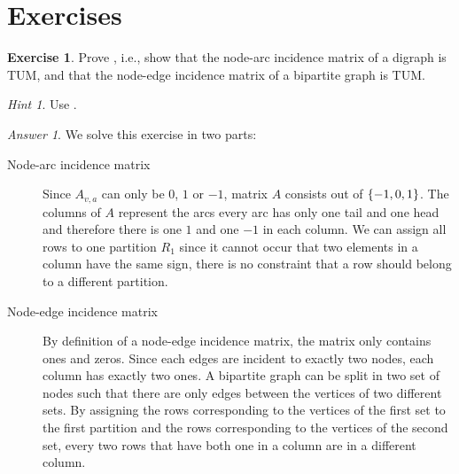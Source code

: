 \documentclass[titlepage]{book}
\theoremstyle{plain}
\theoremstyle{definition}
\newtheorem{exercise}{Exercise}[chapter]
\theoremstyle{remark}
\newtheorem{answer}{Answer}
\newtheorem{hint}{Hint}
\begin{document}
\section*{Exercises}
\begin{exercise}
Prove , i.e., show that the node-arc incidence matrix of a digraph is TUM, and that the node-edge incidence matrix of a bipartite graph is TUM.
\begin{hint}
Use .
\end{hint}
\begin{answer}We solve this exercise in two parts:
\begin{description}
 \item [Node-arc incidence matrix] Since $A_{v,a}$ can only be $0$, $1$ or $-1$, matrix $A$ consists out of $\left\{ -1,0,1 \right\}$. The columns of $A$ represent the arcs every arc has only one tail and one head and therefore there is one $1$ and one $-1$ in each column. We can assign all rows to one partition $R_1$ since it cannot occur that two elements in a column have the same sign, there is no constraint that a row should belong to a different partition.
 \item [Node-edge incidence matrix] By definition of a node-edge incidence matrix, the matrix only contains ones and zeros. Since each edges are incident to exactly two nodes, each column has exactly two ones. A bipartite graph can be split in two set of nodes such that there are only edges between the vertices of two different sets. By assigning the rows corresponding to the vertices of the first set to the first partition and the rows corresponding to the vertices of the second set, every two rows that have both one in a column are in a different column.
\end{description}
\end{answer}
\end{exercise}
\end{document}
